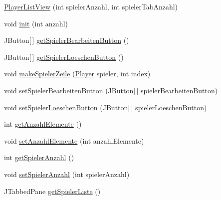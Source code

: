 \begin{DoxyCompactItemize}
\item 
\hyperlink{classde_1_1turnierverwaltung_1_1view_1_1_player_list_view_a29ed9a409515bceec7a58d86f8489817}{Player\+List\+View} (int spieler\+Anzahl, int spieler\+Tab\+Anzahl)
\item 
void \hyperlink{classde_1_1turnierverwaltung_1_1view_1_1_player_list_view_a31aa3df408dbef816880d766193013cc}{init} (int anzahl)
\item 
J\+Button\mbox{[}$\,$\mbox{]} \hyperlink{classde_1_1turnierverwaltung_1_1view_1_1_player_list_view_aa64959c9787d0f75e91102f1650cc491}{get\+Spieler\+Bearbeiten\+Button} ()
\item 
J\+Button\mbox{[}$\,$\mbox{]} \hyperlink{classde_1_1turnierverwaltung_1_1view_1_1_player_list_view_a787367511eb466f09651d4f26506e556}{get\+Spieler\+Loeschen\+Button} ()
\item 
void \hyperlink{classde_1_1turnierverwaltung_1_1view_1_1_player_list_view_ab1d420fbfd36e7639d7ed34c5d588173}{make\+Spieler\+Zeile} (\hyperlink{classde_1_1turnierverwaltung_1_1model_1_1_player}{Player} spieler, int index)
\item 
void \hyperlink{classde_1_1turnierverwaltung_1_1view_1_1_player_list_view_a7c939ccc9e58130b591fc8f08d7e5e1d}{set\+Spieler\+Bearbeiten\+Button} (J\+Button\mbox{[}$\,$\mbox{]} spieler\+Bearbeiten\+Button)
\item 
void \hyperlink{classde_1_1turnierverwaltung_1_1view_1_1_player_list_view_a2c004d4458dbe0cafd1cbe128d294831}{set\+Spieler\+Loeschen\+Button} (J\+Button\mbox{[}$\,$\mbox{]} spieler\+Loeschen\+Button)
\item 
int \hyperlink{classde_1_1turnierverwaltung_1_1view_1_1_player_list_view_ab5c973f0152a5a21daa7d6fe4ff6c65f}{get\+Anzahl\+Elemente} ()
\item 
void \hyperlink{classde_1_1turnierverwaltung_1_1view_1_1_player_list_view_aa56df37a597549e65b92b6b93f61f2ca}{set\+Anzahl\+Elemente} (int anzahl\+Elemente)
\item 
int \hyperlink{classde_1_1turnierverwaltung_1_1view_1_1_player_list_view_aca1219d2cb500f5ddd5b9e5c03b38a36}{get\+Spieler\+Anzahl} ()
\item 
void \hyperlink{classde_1_1turnierverwaltung_1_1view_1_1_player_list_view_a77626327e4be3a9561e466fdd5f962dd}{set\+Spieler\+Anzahl} (int spieler\+Anzahl)
\item 
J\+Tabbed\+Pane \hyperlink{classde_1_1turnierverwaltung_1_1view_1_1_player_list_view_a59f828f2d15335d6cd544a5dc52eb0f8}{get\+Spieler\+Liste} ()

\end{DoxyCompactItemize}
